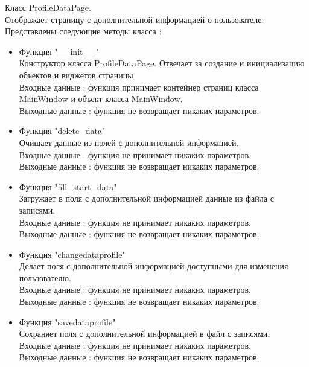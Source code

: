 \documentclass[a4document]{article}
\begin{document}
{\begin{itemize}
        Класс ProfileDataPage.\\
        Отображает страницу с дополнительной информацией о пользователе.\\
        Представлены следующие методы класса :
        
        \begin{itemize}
            \item Функция "\_\_init\_\_" \\
                Конструктор класса ProfileDataPage. Отвечает за создание и инициализацию объектов и виджетов страницы \\
                Входные данные : функция принимает контейнер страниц класса \\MainWindow и объект класса MainWindow.\\
                Выходные данные : функция не возвращает никаких параметров.
            \item Функция "delete\_data" \\
                Очищает данные из полей с дополнительной информацией.\\
                Входные данные : функция не принимает никаких параметров.\\
                Выходные данные : функция не возвращает никаких параметров.
            \newpage
            \item Функция "fill\_start\_data" \\
                Загружает в поля с дополнительной информацией данные из файла с записями.\\
                Входные данные : функция не принимает никаких параметров.\\
                Выходные данные : функция не возвращает никаких параметров.
            \item Функция "changedataprofile" \\
                Делает поля с дополнительной информацией доступными для изменения пользователю. \\
                Входные данные : функция не принимает никаких параметров.\\
                Выходные данные : функция не возвращает никаких параметров.
            \item Функция "savedataprofile" \\
                Сохраняет поля с дополнительной информацией в файл с записями.\\
                Входные данные : функция не принимает никаких параметров.\\
                Выходные данные : функция не возвращает никаких параметров.


\end{itemize}
\end{itemize}}
\end{document}

